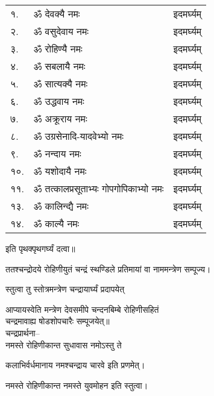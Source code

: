 \begin{center}
\begin{longtable}{ll@{—}l}
१.& ॐ देवक्यै नमः & इदमर्घ्यम्\\
२.& ॐ वसुदेवाय नमः & इदमर्घ्यम्\\
३.& ॐ रोहिण्यै नमः & इदमर्घ्यम्	\\
४.& ॐ सबलायै नमः & इदमर्घ्यम्	\\
५.& ॐ सात्यक्यै नमः & इदमर्घ्यम्\\
६.& ॐ उद्धवाय नमः & इदमर्घ्यम्	\\
७.& ॐ अक्रूराय नमः & इदमर्घ्यम्\\
८.& ॐ उग्रसेनादि-यादवेभ्यो नमः & इदमर्घ्यम्\\
९.& ॐ नन्दाय नमः & इदमर्घ्यम्\\
१०.& ॐ यशोदायै नमः & इदमर्घ्यम्	\\
११.& ॐ तत्कालप्रसूताभ्यः गोपगोपिकाभ्यो नमः & इदमर्घ्यम्\\
१३.& ॐ कालिन्द्यै नमः & इदमर्घ्यम्\\
१४.& ॐ काल्यै नमः & इदमर्घ्यम्\\

\end{longtable}

इति पृथक्पृथगर्घ्यं दत्वा॥\\
\medskip

ततश्चन्द्रोदये रोहिणीयुतं चन्द्रं स्थण्डिले प्रतिमायां वा नाममन्त्रेण सम्पूज्य।

{स्तुत्वा तु स्तोत्रमन्त्रेण चन्द्रायार्घ्यं प्रदापयेत्}
\medskip

आप्यायस्वेति मन्त्रेण देवसमीपे चन्दनबिम्बे रोहिणीसहितं\\
चन्द्रमावाह्य षोडशोपचारैः सम्पूजयेत्॥\\
चन्द्रप्रार्थना–\\




{नमस्ते रोहिणीकान्त सुधावास नमोऽस्तु ते}

{कलाभिर्वर्धमानाय नमश्चन्द्राय चारवे}
इति प्रणमेत्।

{नमस्ते रोहिणीकान्त नमस्ते युवमोहन}
इति स्तुत्वा।
\medskip


\end{center}
